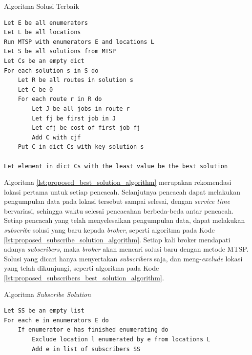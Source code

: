 \begin{listing}
	\caption{Algoritma Solusi Terbaik}
	\label{lst:proposed_best_solution_algorithm}
	\begin{verbatim}
Let E be all enumerators
Let L be all locations
Run MTSP with enumerators E and locations L
Let S be all solutions from MTSP
Let Cs be an empty dict
For each solution s in S do
	Let R be all routes in solution s
	Let C be 0
	For each route r in R do
		Let J be all jobs in route r
		Let fj be first job in J
		Let cfj be cost of first job fj
		Add C with cjf
	Put C in dict Cs with key solution s
	
Let element in dict Cs with the least value be the best solution
	\end{verbatim}
\end{listing}


Algoritma \ref{lst:proposed_best_solution_algorithm} merupakan rekomendasi lokasi pertama untuk setiap pencacah. Selanjutnya pencacah dapat melakukan pengumpulan data pada lokasi tersebut sampai selesai, dengan \textit{service time} bervariasi, sehingga waktu selesai pencacahan berbeda-beda antar pencacah. Setiap pencacah yang telah menyelesaikan pengumpulan data, dapat melakukan \textit{subscribe} solusi yang baru kepada \textit{broker}, seperti algoritma pada Kode \ref{lst:proposed_subscribe_solution_algorithm}. Setiap kali broker mendapati adanya \textit{subscribers}, maka \textit{broker} akan mencari solusi baru dengan metode MTSP. Solusi yang dicari hanya menyertakan \textit{subscribers} saja, dan meng-\textit{exclude} lokasi yang telah dikunjungi, seperti algoritma pada Kode \ref{lst:proposed_subscribers_best_solution_algorithm}.


\begin{listing}
	\caption{Algoritma \textit{Subscribe Solution}}
	\label{lst:proposed_subscribe_solution_algorithm}
	\begin{verbatim}
Let SS be an empty list
For each e in enumerators E do
	If enumerator e has finished enumerating do
		Exclude location l enumerated by e from locations L
		Add e in list of subscribers SS
	\end{verbatim}
\end{listing}


